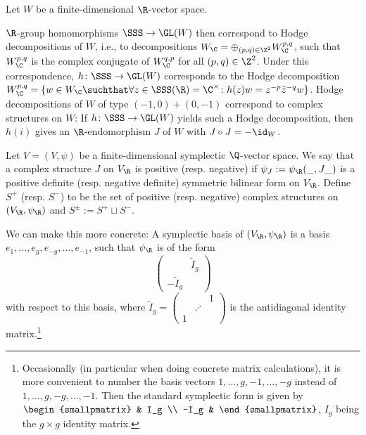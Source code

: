 \documentclass[a4paper]{scrartcl} %
\numberwithin{equation}{section}
\begin{document}
\begin{Example}\label{sympl-ex}
  Let $W$ be a finite-dimensional $\R$-vector space.

  $\R$-group homomorphisms $\SSS\to \GL(W)$ then correspond to Hodge decompositions of $W$, i.e., to decompositions $W_\C=\oplus_{(p,q)\in\Z^2}W_\C^{p,q}$, such that $W_\C^{p,q}$ is the complex conjugate of $W_\C^{q,p}$ for all $(p,q)\in\Z^2$. Under this correspondence, $h\colon \SSS\to \GL(W)$ corresponds to the Hodge decomposition $W_\C^{p,q}=\{ w\in W_\C \suchthat \forall z\in\SSS(\R)=\C^\times\colon h(z)w=z^{-p}\bar{z}^{-q}w \}$. Hodge decompositions of $W$ of type $(-1,0)+(0,-1)$ correspond to complex structures on $W$: If $h\colon\SSS\to\GL(W)$ yields such a Hodge decomposition, then $h(i)$ gives an $\R$-endomorphism $J$ of $W$ with $J\circ J=-\id_W$.

  
  Let $V=(V,\psi)$ be a finite-dimensional symplectic $\Q$-vector space. We say that a complex structure $J$ on $V_\R$ is positive (resp. negative) if $\psi_J:=\psi_\R(\_,J\_)$ is a positive definite (resp. negative definite) symmetric bilinear form on $V_\R$. Define $S^+$ (resp. $S^-$) to be the set of positive (resp. negative) complex structures on $(V_\R,\psi_\R)$ and $S^\pm:=S^+\sqcup S^-$.

   We can make this more concrete: A symplectic basis of $(V_\R,\psi_\R)$ is a basis $e_1,\dotsc,\allowbreak e_g, e_{-g}, \dotsc, \allowbreak e_{-1}$, such that $\psi_\R$ is of the form
  \begin{equation*}
    \begin{pmatrix}
      & \tilde{I}_g \\
      -\tilde{I}_g &
    \end{pmatrix}
  \end{equation*}
  with respect to this basis, where $\tilde{I}_g=
  \begin{pmatrix}
    & & 1\\
    & \iddots & \\
    1 & &
  \end{pmatrix}$ is the antidiagonal identity matrix.\footnote{Occasionally (in particular when doing concrete matrix calculations), it is more convenient to number the basis vectors $1,\dotsc,g,-1,\dotsc,-g$ instead of $1,\dotsc,g,-g,\dotsc,-1$. Then the standard symplectic form is given by $\begin{smallpmatrix}
      & I_g \\
      -I_g &
    \end{smallpmatrix}$, $I_g$ being the $g\times g$ identity matrix.}


\end{Example}
\end{document}
